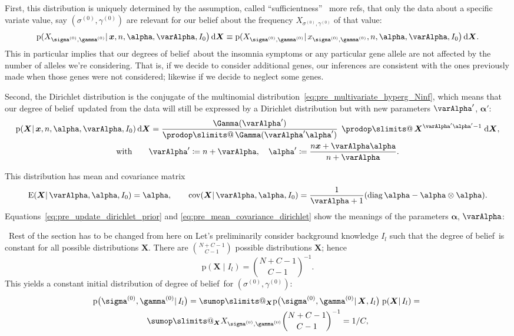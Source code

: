 \documentclass[\ifafour a4paper,12pt,\else a5paper,10pt,\fi%
onecolumn,oneside,article,%
british%
]{memoir}
\makeatletter
\theoremstyle{remark}
\theoremstyle{innote}
\def\sum{\DOTSI\sumop\slimits@}
\def\prod{\DOTSI\prodop\slimits@}
\newcommand*{\citep}{\parencites}
\newcommand*{\di}{\mathrm{d}}%
\newcommand*{\defd}{\coloneqq}
\newcommand*{\pf}{\mathrm{p}}%
\renewcommand*{\|}{\mathpunct{|}}
\newcommand*{\tprod}{\mathop{\textstyle\prod}\nolimits}
\newcommand*{\E}{\mathrm{E}}
\newcommand*{\puzzle}{\maltese}
\newcommand{\mynote}[1]{ {\color{notecolour}\puzzle\ #1}}
\DeclareMathOperator{\cov}{cov}
\DeclareMathOperator{\diag}{diag}
\newcommand*{\dob}{degree of belief}
\newcommand*{\dobs}{degrees of belief}
\newcommand*{\yprod}{\tprod}
\newcommand*{\ys}{\sigma}
\newcommand*{\yg}{\gamma}
\newcommand*{\gn}{l}
\newcommand*{\ysi}[1]{\ys^{(#1)}}
\newcommand*{\ygi}[1]{\yg^{(#1)}}
\newcommand*{\yso}{\ysi{0}}
\newcommand*{\ygo}{\ygi{0}}
\newcommand*{\yF}{\bm{X}}
\newcommand*{\yf}{\bm{x}}
\newcommand*{\yIc}{I_{\gn}}
\newcommand*{\yIo}{I_{0}}
\newcommand*{\yA}{\varAlpha}
\newcommand*{\ya}{\bm{\alpha}}
\makeatother
\begin{document}
First, this distribution
is uniquely determined by the assumption, called \enquote{sufficientness}
\citep{zabell1982,dinizetal2016}\mynote{more refs}, that only the data
about a specific variate value, say $(\yso, \ygo)$ are relevant for our
belief about the frequency $X_{\yso, \ygo}$ of that value:
\begin{equation}
  \label{eq:pre_sufficientness}
  \pf(X_{\yso, \ygo} \| \yf, n, \ya, \yA,\yIo\bigr)\,\di\yF \equiv
  \pf(X_{\yso, \ygo} \| x_{\yso,\ygo}, n, \ya, \yA,\yIo\bigr)\,\di\yF.
\end{equation}
This in particular implies that our \dobs\ about the insomnia symptoms or
any particular gene allele are not affected by the number of alleles we're
considering. That is, if we decide to consider additional genes, our
inferences are consistent with the ones previously made when those genes
were not considered; likewise if we decide to neglect some genes.

Second, the Dirichlet distribution is the conjugate of the multinomial
distribution~\eqref{eq:pre_multivariate_hyperg_Ninf}, which means that our
\dob\ updated from the data will still be expressed by a Dirichlet
distribution but with new parameters $\yA'$, $\ya'$:
\begin{multline}
  \label{eq:pre_update_dirichlet_prior}
  \pf(\yF \| \yf, n, \ya, \yA,\yIo)\,\di\yF =
  \frac{\Gamma(\yA')}{\yprod\Gamma(\yA'\ya')}\;
  \yprod \yF^{\yA'\ya'-1}\;\di\yF,\\
  \text{with}\qquad
  \yA' \defd n + \yA,
  \quad
  \ya' \defd \frac{n\yf + \yA\ya}{n+\yA}.
\end{multline}

This distribution has mean and covariance matrix
\begin{equation}\label{eq:pre_mean_covariance_dirichlet}
  \E(\yF \| \yA, \ya,\yIo) = \ya, \qquad
  \cov(\yF \| \yA, \ya,\yIo) =
  \frac{1}{\yA+1}(\diag\ya -\ya\otimes\ya).
\end{equation}
Equations~\eqref{eq:pre_update_dirichlet_prior} and
\eqref{eq:pre_mean_covariance_dirichlet} show the meanings of the parameters
$\ya$, $\yA$:




\mynote{Rest of the section has to be changed from here on}
Let's preliminarily consider background
knowledge $\yIc$ such that the \dob\ is constant for all possible
distributions $\yF$. There are $\binom{N+C-1}{C-1}$ possible distributions
$\yF$; hence
\begin{equation}
  \label{eq:pre_constant_prior}
  \pf(\yF \| \yIc) = \binom{N+C-1}{C-1}^{-1}.
\end{equation}
This yields a constant  initial  distribution of \dob\ for $(\yso,\ygo)$:
\begin{multline}
  \label{eq:pre_joint_prob_initial_F_unknown}
  \pf\bigl(\yso, \ygo \| \yIc\bigr)  =
  \sum_{\yF}  \pf\bigl(\yso, \ygo \| \yF,\yIc\bigr) \;
  \pf( \yF \| \yIc) ={}\\
  \sum_{\yF}  X_{\yso, \ygo} \binom{N+C-1}{C-1}^{-1}
  = 1/C,
\end{multline}
\end{document}
